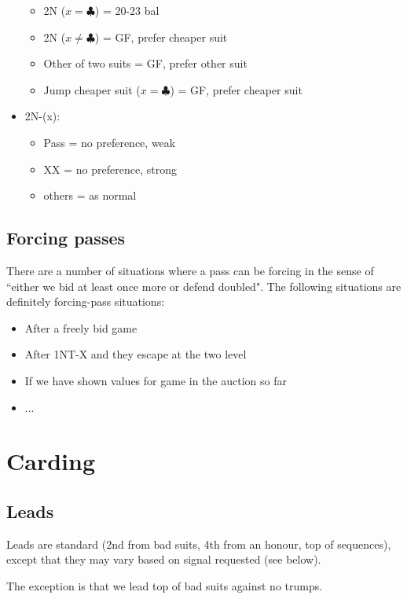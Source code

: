 \documentclass[a4paper,14pt]{extarticle}
\begin{document}
\begin{itemize}
\begin{itemize}
	\item 2N ($x = \clubsuit$) = 20-23 bal
	\item 2N ($x \neq \clubsuit$) = GF, prefer cheaper suit
	\item Other of two suits = GF, prefer other suit
	\item Jump cheaper suit ($x = \clubsuit$) = GF, prefer cheaper suit
   \end{itemize}
\item 2N-(x):
   \begin{itemize}
	\item Pass = no preference, weak
	\item XX = no preference, strong
	\item others = as normal
   \end{itemize}
\end{itemize}

\subsection{Forcing passes}
\label{sec:forcepass}

There are a number of situations where a pass can be forcing in the sense of
``either we bid at least once more or defend doubled". The following situations
are definitely forcing-pass situations:

\begin{itemize}
\item After a freely bid game
\item After 1NT-X and they escape at the two level
\item If we have shown values for game in the auction so far
\item ...
\end{itemize}

\newpage

\section{Carding}
\label{sec:carding}

\subsection{Leads}
\label{sec:card:leads}

Leads are standard (2nd from bad suits, 4th from an honour, top of sequences),
except that they may vary based on signal requested (see below).

The exception is that we lead top of bad suits against no trumps.
\end{document}
